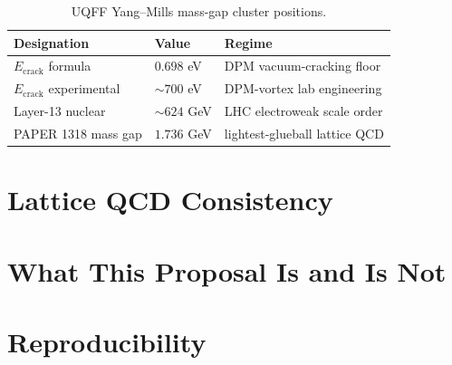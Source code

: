 \documentclass[11pt,a4paper,onecolumn]{article}
\theoremstyle{plain}
\theoremstyle{definition}
\theoremstyle{remark}
\begin{document}
\begin{table}[h!]
\centering
\caption{UQFF Yang--Mills mass-gap cluster positions.}
\label{tab:clusters}
\begin{tabular}{lll}
\toprule
Designation & Value & Regime \\
\midrule
$E_{\text{crack}}$ formula        & $0.698$ eV   & DPM vacuum-cracking floor \\
$E_{\text{crack}}$ experimental   & $\sim700$ eV & DPM-vortex lab engineering \\
Layer-13 nuclear                  & $\sim624$ GeV & LHC electroweak scale order \\
PAPER 1318 mass gap               & $1.736$ GeV  & lightest-glueball lattice QCD \\
\bottomrule
\end{tabular}
\end{table}

\section{Lattice QCD Consistency}\label{sec:lattice}


\section{What This Proposal Is and Is Not}\label{sec:scope}


\section{Reproducibility}\label{sec:reproducibility}
\end{document}
